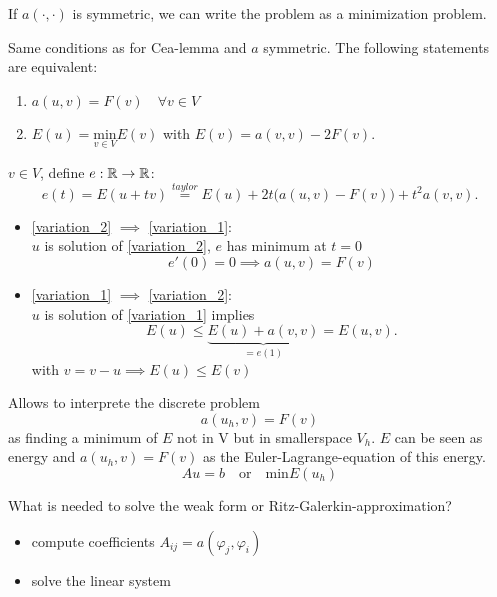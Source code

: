 If $a(\cdot,\cdot)$ is symmetric, we can write the problem as a minimization problem.
\begin{lemma_}
	Same conditions as for Cea-lemma and $a$ symmetric. The following statements are equivalent:
	\begin{enumerate}[label=(\alph*)]
		\item \label{variation_1} $a(u,v)= F(v) \quad \forall v\in V$ 
		\item \label{variation_2} $E(u) = \underset{v \in V}{\text{min}}E(v) $ with $E(v) = a(v,v) -2F(v)$.
	\end{enumerate}
\end{lemma_}

\begin{proof_}
	$v \in V$, define $e:\mathbb{R} \to \mathbb{R}$:
	\begin{equation*}
		e(t) = E(u+tv) \overset{taylor}{=} E(u) + 2t\big ( a(u,v) - F(v)\big ) +t^2 a(v,v)  .
	\end{equation*}
	\begin{itemize}
		\item  \ref{variation_2} $\implies$  \ref{variation_1}:\\
			$u$ is solution of \ref{variation_2}, $e$ has minimum at $t=0$
			\begin{equation*}
				e'(0)=0 \implies a(u,v)=F(v)
			\end{equation*} 
		\item \ref{variation_1} $\implies$  \ref{variation_2}:\\
			$u$ is solution of \ref{variation_1} implies
			\begin{equation*}
				E(u) \leq \underbrace{E(u) + a(v,v)}_{= e(1)} = E(u,v).
			\end{equation*}
			with $v = v-u \implies E(u) \leq E(v)$
	\end{itemize}
\end{proof_}

Allows to interprete the discrete problem 
\begin{equation*}
	a(u_h,v) = F(v)
\end{equation*}
as finding a minimum of $E$ not in V but in \glqq smaller\grqq space $V_h$. $E$ can be seen as energy and $a(u_h,v) = F(v)$ as the Euler-Lagrange-equation of this energy. 
\begin{equation*}
	Au=b \quad \text{or} \quad \text{min}E(u_h)
\end{equation*}
\par
What is needed to solve the weak form or Ritz-Galerkin-approximation?
\begin{itemize}
	\item compute coefficients $A_{ij} = a(\varphi_j,\varphi_i)$
	\item solve the linear system
\end{itemize}

